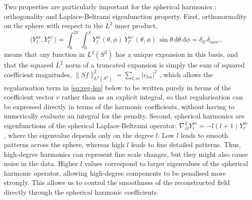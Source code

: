 \documentclass[11pt,a4paper]{report}
\begin{document}
Two properties are particularly important for the spherical harmonics : orthogonality and Laplace-Beltrami eigenfunction property. First, orthonormality on the sphere with respect to the $L^2$ inner product,
\begin{equation}
    \langle Y_l^m, Y_{l'}^{m'}\rangle = \int_0^{2\pi}\!\!\int_0^\pi Y_l^m(\theta,\phi)\,\overline{Y_{l'}^{m'}(\theta,\phi)}\,\sin\theta\,\mathrm{d}\theta\,\mathrm{d}\phi = \delta_{ll'}\delta_{mm'},
    \label{eq:orthogonality}
\end{equation}
means that any function in $L^2(S^2)$ has a unique expansion in this basis, and that the squared $L^2$ norm of a truncated expansion is simply the sum of squared coefficient magnitudes, $\|Sf\|^2_{L^2(S^2)} = \sum_{l,m}|v_{lm}|^2$ , which allows the regularisation term in \cref{eq:reg-lsq} below to be written purely in terms of the coefficient vector $v$ rather than as an explicit integral, so that regularisation can be expressed directly in terms of the harmonic coefficients, without having to numerically evaluate an integral for the penalty. Second, spherical harmonics are eigenfunctions of the spherical Laplace-Beltrami operator: $\nabla^2_\Omega Y_l^m = -l(l+1)Y_l^m$, where the eigenvalue depends only on the degree $l$. Low $l$ leads to smooth patterns across the sphere, whereas high $l$ leads to fine detailed patterns. Thus, high-degree harmonics can represent fine scale changes, but they might also cause noise in the data. Higher $l$ values correspond to larger eigenvalues of the spherical harmonic operator, allowing high-degree components to be penalised more strongly. This allows us to control the smoothness of the reconstructed field directly through the spherical harmonic coefficients. 
\end{document}
